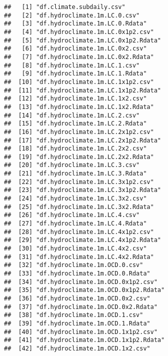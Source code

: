\documentclass[
]{article}
\begin{document}
\begin{verbatim}
##   [1] "df.climate.subdaily.csv"                          
##   [2] "df.hydroclimate.1m.LC.0.csv"                      
##   [3] "df.hydroclimate.1m.LC.0.Rdata"                    
##   [4] "df.hydroclimate.1m.LC.0x1p2.csv"                  
##   [5] "df.hydroclimate.1m.LC.0x1p2.Rdata"                
##   [6] "df.hydroclimate.1m.LC.0x2.csv"                    
##   [7] "df.hydroclimate.1m.LC.0x2.Rdata"                  
##   [8] "df.hydroclimate.1m.LC.1.csv"                      
##   [9] "df.hydroclimate.1m.LC.1.Rdata"                    
##  [10] "df.hydroclimate.1m.LC.1x1p2.csv"                  
##  [11] "df.hydroclimate.1m.LC.1x1p2.Rdata"                
##  [12] "df.hydroclimate.1m.LC.1x2.csv"                    
##  [13] "df.hydroclimate.1m.LC.1x2.Rdata"                  
##  [14] "df.hydroclimate.1m.LC.2.csv"                      
##  [15] "df.hydroclimate.1m.LC.2.Rdata"                    
##  [16] "df.hydroclimate.1m.LC.2x1p2.csv"                  
##  [17] "df.hydroclimate.1m.LC.2x1p2.Rdata"                
##  [18] "df.hydroclimate.1m.LC.2x2.csv"                    
##  [19] "df.hydroclimate.1m.LC.2x2.Rdata"                  
##  [20] "df.hydroclimate.1m.LC.3.csv"                      
##  [21] "df.hydroclimate.1m.LC.3.Rdata"                    
##  [22] "df.hydroclimate.1m.LC.3x1p2.csv"                  
##  [23] "df.hydroclimate.1m.LC.3x1p2.Rdata"                
##  [24] "df.hydroclimate.1m.LC.3x2.csv"                    
##  [25] "df.hydroclimate.1m.LC.3x2.Rdata"                  
##  [26] "df.hydroclimate.1m.LC.4.csv"                      
##  [27] "df.hydroclimate.1m.LC.4.Rdata"                    
##  [28] "df.hydroclimate.1m.LC.4x1p2.csv"                  
##  [29] "df.hydroclimate.1m.LC.4x1p2.Rdata"                
##  [30] "df.hydroclimate.1m.LC.4x2.csv"                    
##  [31] "df.hydroclimate.1m.LC.4x2.Rdata"                  
##  [32] "df.hydroclimate.1m.OCD.0.csv"                     
##  [33] "df.hydroclimate.1m.OCD.0.Rdata"                   
##  [34] "df.hydroclimate.1m.OCD.0x1p2.csv"                 
##  [35] "df.hydroclimate.1m.OCD.0x1p2.Rdata"               
##  [36] "df.hydroclimate.1m.OCD.0x2.csv"                   
##  [37] "df.hydroclimate.1m.OCD.0x2.Rdata"                 
##  [38] "df.hydroclimate.1m.OCD.1.csv"                     
##  [39] "df.hydroclimate.1m.OCD.1.Rdata"                   
##  [40] "df.hydroclimate.1m.OCD.1x1p2.csv"                 
##  [41] "df.hydroclimate.1m.OCD.1x1p2.Rdata"               
##  [42] "df.hydroclimate.1m.OCD.1x2.csv"                   

\end{verbatim}
\end{document}
